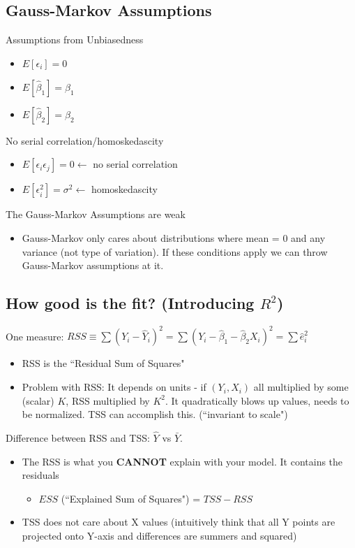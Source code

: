 \documentclass[10pt, oneside]{article}
\begin{document}
\subsection{Gauss-Markov Assumptions}
{Assumptions from Unbiasedness}
\begin{itemize}
    \item $E[\epsilon_i] = 0$
    \item $E[\hat \beta_1] = \beta_1$
    \item $E[\hat \beta_2] = \beta_2$
\end{itemize}
{No serial correlation/homoskedascity}
\begin{itemize}
    \item $E[\epsilon_i\epsilon_j] = 0 \leftarrow $ no serial correlation
    \item $E[\epsilon_i^2] = \sigma^2 \leftarrow $ homoskedascity
\end{itemize}
The Gauss-Markov Assumptions are weak
\begin{itemize}
    \item Gauss-Markov only cares about distributions where mean = 0 and any variance (not type of variation). If these conditions apply we can throw Gauss-Markov assumptions at it.
\end{itemize}

\subsection{How good is the fit? (Introducing $R^2$)}
One measure: $RSS\equiv \sum(Y_i-\hat Y_i)^2 = \sum(Y_i -\hat \beta_1 -\hat \beta_2X_i)^2 = \sum \hat e_i^2$
\begin{itemize}
    \item RSS is the ``Residual Sum of Squares"
    \item Problem with RSS: It depends on units - if $(Y_i, X_i)$ all multiplied by some (scalar) $K$, RSS multiplied by $K^2$. It quadratically blows up values, needs to be normalized. TSS can accomplish this. (``invariant to scale")
\end{itemize}
Difference between RSS and TSS: $\hat Y$ vs $\bar Y$.
\begin{itemize}
    \item The RSS is what you \textbf{CANNOT} explain with your model. It contains the residuals
    \begin{itemize}
        \item $ESS$ (``Explained Sum of Squares") = $TSS-RSS$
    \end{itemize}
    \item TSS does not care about X values (intuitively think that all Y points are projected onto Y-axis and differences are summers and squared)
\end{itemize}
\end{document}
